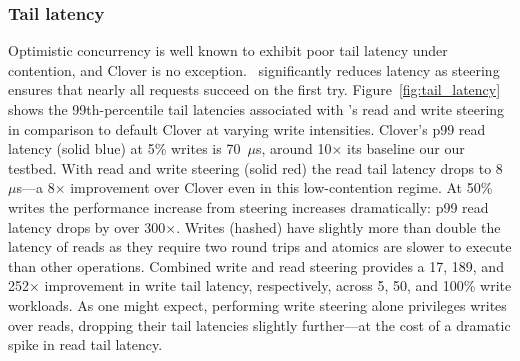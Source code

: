 \subsubsection{Tail latency}

Optimistic concurrency is well known to exhibit poor tail latency under
contention, and Clover is no exception.  \sword\ significantly reduces latency
as steering ensures that nearly all requests succeed on the first try.
%
Figure~\ref{fig:tail_latency} shows the 99th-percentile tail latencies
associated with \sword's read and write steering in comparison to default Clover
at varying write intensities. Clover's p99 read latency (solid blue) at 5\%
writes is 70~$\mu$s, around 10$\times$ its baseline our our testbed. With read
and write steering (solid red) the read tail latency drops to 8~$\mu$s---a
8$\times$ improvement over Clover even in this low-contention regime. At 50\%
writes the performance increase from steering increases dramatically: p99 read latency drops by over 300$\times$.
%
%
Writes (hashed) have slightly more than double the latency of reads as they
require two round trips and atomics are slower to execute than other operations.
Combined write and read steering provides a 17, 189, and 252$\times$ improvement
in write tail latency, respectively, across 5, 50, and 100\% write workloads.
As one might expect, performing write steering alone privileges writes over
reads, dropping their tail latencies slightly further---at the cost of a
dramatic spike in read tail latency.

